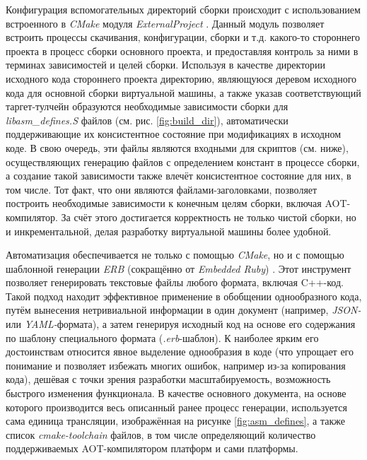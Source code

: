 \par
Конфигурация вспомогательных директорий сборки происходит с использованием встроенного в \textit{CMake} модуля \textit{ExternalProject} \cite{cmake-ext-proj}.
Данный модуль позволяет встроить процессы скачивания, конфигурации, сборки и т.д. какого-то стороннего проекта в процесс сборки основного проекта, и предоставляя контроль за ними в терминах зависимостей и целей сборки.
Используя в качестве директории исходного кода стороннего проекта директорию, являющуюся деревом исходного кода для основной сборки виртуальной машины, а также указав соответствующий таргет-тулчейн образуются необходимые зависимости сборки для \textit{libasm\_defines.S} файлов (см. рис. \ref{fig:build_dir}), автоматически поддерживающие их консистентное состояние при модификациях в исходном коде.
В свою очередь, эти файлы являются входными для скриптов (см. ниже), осуществляющих генерацию файлов с определением констант в процессе сборки, а создание такой зависимости также влечёт консистентное состояние для них, в том числе. Тот факт, что они являются файлами-заголовками, позволяет построить необходимые зависимости к конечным целям сборки, включая AOT-компилятор. За счёт этого достигается корректность не только чистой сборки, но и инкрементальной, делая разработку виртуальной машины более удобной.

\par
Автоматизация обеспечивается не только с помощью \textit{CMake}, но и с помощью шаблонной генерации \textit{ERB} (сокращённо от \textit{Embedded Ruby}) \cite{erb}. Этот инструмент позволяет генерировать текстовые файлы любого формата, включая C++-код. Такой подход находит эффективное применение в обобщении однообразного кода, путём вынесения нетривиальной информации в один документ (например, \textit{JSON-} или \textit{YAML-}формата), а затем генерируя исходный код на основе его содержания по шаблону специального формата (\textit{.erb}-шаблон). К наиболее ярким его достоинствам относится явное выделение однообразия в коде (что упрощает его понимание и позволяет избежать многих ошибок, например из-за копирования кода), дешёвая с точки зрения разработки масштабируемость, возможность быстрого изменения функционала. В качестве основного документа, на основе которого производится весь описанный ранее процесс генерации, используется сама единица трансляции, изображённая на рисунке \ref{fig:asm_defines}, а также список \textit{cmake-toolchain} файлов, в том числе определяющий количество поддерживаемых AOT-компилятором платформ и сами платформы.

